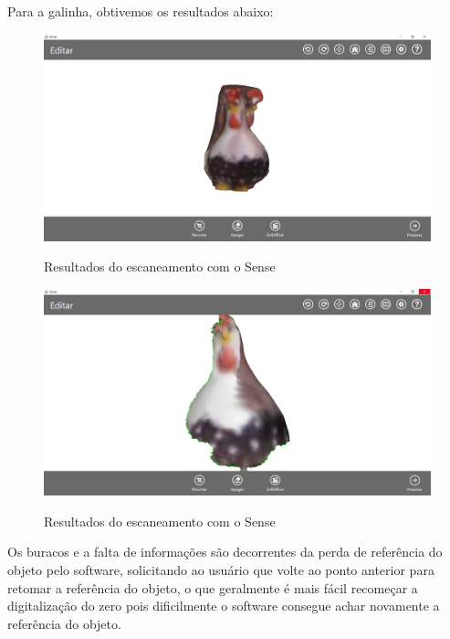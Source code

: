 Para a galinha, obtivemos os resultados abaixo:

\begin{figure}[!h]
	\centering
	\caption{Resultados do escaneamento com o Sense}
	\includegraphics[width=0.9\linewidth]{figs/sense7v2.png}
		\label{fig:sense3}
\end{figure} 

\newpage

\begin{figure}[!h]
	\centering
	\caption{Resultados do escaneamento com o Sense}
	\includegraphics[width=0.9\linewidth]{figs/sense8v2.png}
		\label{fig:sense3}
\end{figure} 


Os buracos e a falta de informações são decorrentes da perda de referência do objeto pelo software, solicitando ao usuário que volte ao ponto anterior para retomar a referência do objeto, o que geralmente é mais fácil recomeçar a digitalização do zero pois dificilmente o software consegue achar novamente a referência do objeto. 

